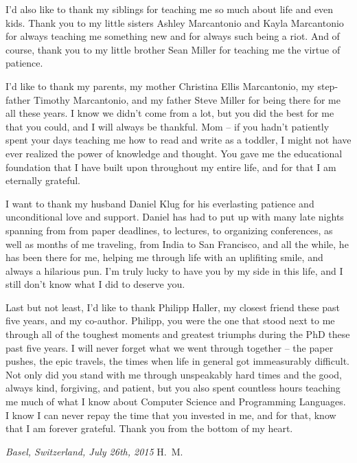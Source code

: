 \vspace{0.5cm}
I'd also like to thank my siblings for teaching me so much about life and even
kids. Thank you to my little sisters Ashley Marcantonio and Kayla Marcantonio
for always teaching me something new and for always such being a riot. And of
course, thank you to my little brother Sean Miller for teaching me the virtue of
patience.

\vspace{0.5cm}
I'd like to thank my parents, my mother Christina Ellis Marcantonio, my
step-father Timothy Marcantonio, and my father Steve Miller for being there for
me all these years. I know we didn't come from a lot, but you did the best for
me that you could, and I will always be thankful. Mom -- if you hadn't patiently
spent your days teaching me how to read and write as a toddler, I might not have
ever realized the power of knowledge and thought. You gave me the educational
foundation that I have built upon throughout my entire life, and for that I am
eternally grateful.

\vspace{0.5cm}
I want to thank my husband Daniel Klug for his everlasting patience and
unconditional love and support. Daniel has had to put up with many late nights
spanning from from paper deadlines, to lectures, to organizing conferences, as
well as months of me traveling, from India to San Francisco, and all the while,
he has been there for me, helping me through life with an uplifiting smile, and
always a hilarious pun. I'm truly lucky to have you by my side in this life, and
I still don't know what I did to deserve you.

\vspace{0.5cm}
Last but not least, I'd like to thank Philipp Haller, my closest friend these
past five years, and my co-author. Philipp, you were the one that stood next to
me through all of the toughest moments and greatest triumphs during the PhD
these past five years. I will never forget what we went through together -- the
paper pushes, the epic travels, the times when life in general got immeasurably
difficult. Not only did you stand with me through unspeakably hard times and the
good, always kind, forgiving, and patient, but you also spent countless hours
teaching me much of what I know about Computer Science and Programming
Languages. I know I can never repay the time that you invested in me, and for
that, know that I am forever grateful. Thank you from the bottom of my heart.

\bigskip

\noindent\textit{Basel, Switzerland, July 26th, 2015}
\hfill H.~M.
